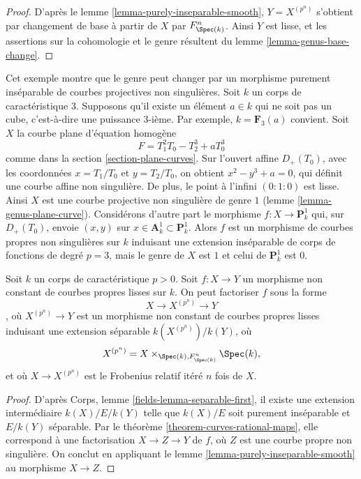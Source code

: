 \begin{proof}
D'après le lemme \ref{lemma-purely-inseparable-smooth}, $Y = X^{(p^n)}$ s'obtient par changement de base à partir de $X$ par $F_{\Spec(k)}^n$. Ainsi $Y$ est lisse, et les assertions sur la cohomologie et le genre résultent du lemme \ref{lemma-genus-base-change}.
\end{proof}

\begin{example}
\label{example-inseparable}
Cet exemple montre que le genre peut changer par un morphisme purement inséparable de courbes projectives non singulières. Soit $k$ un corps de caractéristique $3$. Supposons qu'il existe un élément $a \in k$ qui ne soit pas un cube, c'est-à-dire une puissance $3$-ième. Par exemple, $k = \mathbf{F}_3(a)$ convient. Soit $X$ la courbe plane d'équation homogène $$
F = T_1^2T_0 - T_2^3 + aT_0^3
$$ comme dans la section \ref{section-plane-curves}. Sur l'ouvert affine $D_+(T_0)$, avec les coordonnées $x = T_1/T_0$ et $y = T_2/T_0$, on obtient $x^2 - y^3 + a = 0$, qui définit une courbe affine non singulière. De plus, le point à l'infini $(0 : 1: 0)$ est lisse. Ainsi $X$ est une courbe projective non singulière de genre $1$ (lemme \ref{lemma-genus-plane-curve}). Considérons d'autre part le morphisme $f : X \to \mathbf{P}^1_k$ qui, sur $D_+(T_0)$, envoie $(x, y)$ sur $x \in \mathbf{A}^1_k \subset \mathbf{P}^1_k$. Alors $f$ est un morphisme de courbes propres non singulières sur $k$ induisant une extension inséparable de corps de fonctions de degré $p = 3$, mais le genre de $X$ est $1$ et celui de $\mathbf{P}^1_k$ est $0$.
\end{example}

\begin{proposition}
\label{proposition-unwind-morphism-smooth}
Soit $k$ un corps de caractéristique $p > 0$. Soit $f : X \to Y$ un morphisme non constant de courbes propres lisses sur $k$. On peut factoriser $f$ sous la forme $$
X \longrightarrow X^{(p^n)} \longrightarrow Y
$$, où $X^{(p^n)} \to Y$ est un morphisme non constant de courbes propres lisses induisant une extension séparable $k(X^{(p^n)})/k(Y)$, où $$
X^{(p^n)} = X \times_{\Spec(k), F_{\Spec(k)}^n} \Spec(k),
$$ et où $X \to X^{(p^n)}$ est le Frobenius relatif itéré $n$ fois de $X$.
\end{proposition}

\begin{proof}
D'après Corps, lemme \ref{fields-lemma-separable-first}, il existe une extension intermédiaire $k(X)/E/k(Y)$ telle que $k(X)/E$ soit purement inséparable et $E/k(Y)$ séparable. Par le théorème \ref{theorem-curves-rational-maps}, elle correspond à une factorisation $X \to Z \to Y$ de $f$, où $Z$ est une courbe propre non singulière. On conclut en appliquant le lemme \ref{lemma-purely-inseparable-smooth} au morphisme $X \to Z$.
\end{proof}

